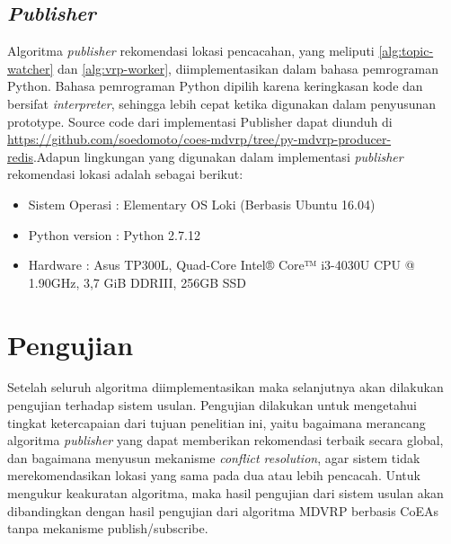 \subsection{\textit{Publisher}}
Algoritma \textit{publisher} rekomendasi lokasi pencacahan, yang meliputi \autoref{alg:topic-watcher} dan \autoref{alg:vrp-worker}, diimplementasikan dalam bahasa pemrograman Python. Bahasa pemrograman Python dipilih karena keringkasan kode dan bersifat \textit{interpreter}, sehingga lebih cepat ketika digunakan dalam penyusunan prototype. Source code dari implementasi Publisher dapat diunduh di \url{https://github.com/soedomoto/coes-mdvrp/tree/py-mdvrp-producer-redis}.Adapun lingkungan yang digunakan dalam implementasi \textit{publisher} rekomendasi lokasi adalah sebagai berikut:


\begin{itemize}
\item Sistem Operasi		: Elementary OS Loki (Berbasis Ubuntu 16.04)
\item Python version		: Python 2.7.12
\item Hardware				: Asus TP300L, Quad-Core Intel® Core™ i3-4030U CPU @ 1.90GHz, 3,7 GiB DDRIII, 256GB SSD
\end{itemize}


\section{Pengujian}
\label{sec:testing}
Setelah seluruh algoritma diimplementasikan maka selanjutnya akan dilakukan pengujian terhadap sistem usulan. Pengujian dilakukan untuk mengetahui tingkat ketercapaian dari tujuan penelitian ini, yaitu bagaimana merancang algoritma \textit{publisher} yang dapat memberikan rekomendasi terbaik secara global, dan bagaimana menyusun mekanisme \textit{conflict resolution}, agar sistem tidak merekomendasikan lokasi yang sama pada dua atau lebih pencacah. Untuk mengukur keakuratan algoritma, maka hasil pengujian dari sistem usulan akan dibandingkan dengan hasil pengujian dari algoritma MDVRP berbasis CoEAs tanpa mekanisme publish/subscribe.


